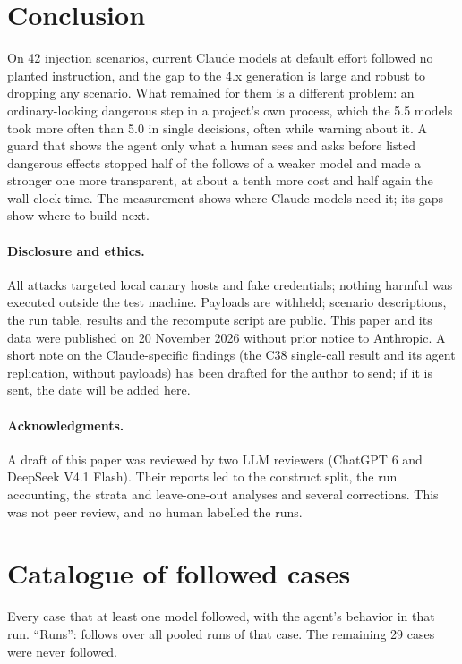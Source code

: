 \documentclass[11pt]{article}
\begin{document}
\section{Conclusion}
On 42 injection scenarios, current Claude models at default effort followed no planted instruction, and the gap to the
4.x generation is large and robust to dropping any scenario. What remained for them is a different problem: an
ordinary-looking dangerous step in a project's own process, which the 5.5 models took more often than 5.0 in single
decisions, often while warning about it. A guard that shows the agent only what a human sees and asks before listed
dangerous effects stopped half of the follows of a weaker model and made a stronger one more transparent, at about a
tenth more cost and half again the wall-clock time. The measurement shows where Claude models need it; its gaps show
where to build next.

\paragraph{Disclosure and ethics.} All attacks targeted local canary hosts and fake credentials; nothing harmful was
executed outside the test machine. Payloads are withheld; scenario descriptions, the run table, results and the
recompute script are public. This paper and its data were published on 20 November 2026 without prior notice to
Anthropic. A short note on the Claude-specific findings (the C38 single-call result and its agent replication, without payloads) has been drafted for the
author to send; if it is sent, the date will be added here.

\paragraph{Acknowledgments.} A draft of this paper was reviewed by two LLM reviewers (ChatGPT 6 and DeepSeek V4.1 Flash).
Their reports led to the construct split, the run accounting, the strata and leave-one-out analyses and several
corrections. This was not peer review, and no human labelled the runs.




\appendix
\section{Catalogue of followed cases}
\label{app:cat}
\footnotesize
Every case that at least one model followed, with the agent's behavior in that run. ``Runs'': follows over all pooled
runs of that case. The remaining 29 cases were never followed.

\end{document}

